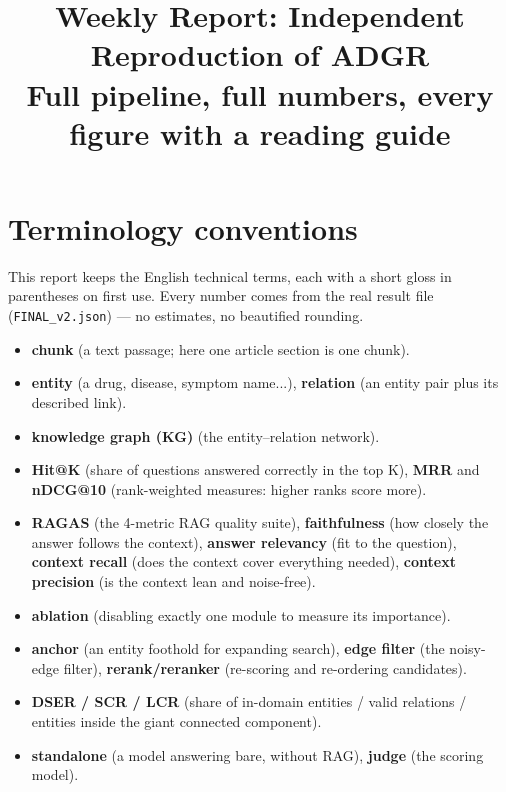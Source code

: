\documentclass[12pt,a4paper]{article}
\title{Weekly Report: Independent Reproduction of ADGR\\ \large Full pipeline, full numbers, every figure with a reading guide}
\date{}
\begin{document}
\maketitle
\renewcommand{\contentsname}{Contents}
\tableofcontents
\newpage

\section{Terminology conventions}
This report keeps the English technical terms, each with a short gloss in
parentheses on first use. Every number comes from the real result file
(\texttt{FINAL\_v2.json}) --- no estimates, no beautified rounding.
\begin{itemize}[leftmargin=*]
\item \textbf{chunk} (a text passage; here one article section is one chunk).
\item \textbf{entity} (a drug, disease, symptom name...),
\textbf{relation} (an entity pair plus its described link).
\item \textbf{knowledge graph (KG)} (the entity--relation network).
\item \textbf{Hit@K} (share of questions answered correctly in the top K),
\textbf{MRR} and \textbf{nDCG@10} (rank-weighted measures: higher ranks score
more).
\item \textbf{RAGAS} (the 4-metric RAG quality suite),
\textbf{faithfulness} (how closely the answer follows the context),
\textbf{answer relevancy} (fit to the question),
\textbf{context recall} (does the context cover everything needed),
\textbf{context precision} (is the context lean and noise-free).
\item \textbf{ablation} (disabling exactly one module to measure its
importance).
\item \textbf{anchor} (an entity foothold for expanding search),
\textbf{edge filter} (the noisy-edge filter),
\textbf{rerank/reranker} (re-scoring and re-ordering candidates).
\item \textbf{DSER / SCR / LCR} (share of in-domain entities / valid relations
/ entities inside the giant connected component).
\item \textbf{standalone} (a model answering bare, without RAG),
\textbf{judge} (the scoring model).
\end{itemize}

\end{document}
